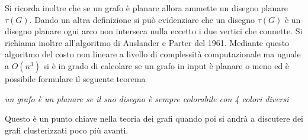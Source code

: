Si ricorda inoltre che se un grafo è planare allora ammette un disegno planare $\tau(G)$. Dando un altra definizione si può evidenziare che un disegno $\tau(G)$ è un disegno planare ogni arco non interseca nulla eccetto i due vertici che connette. Si richiama inoltre all'algoritmo di Auslander e Parter del 1961. Mediante questo algoritmo del costo non lineare a livello di complessità computazionale ma uguale a $O(n^3)$ si è in grado di calcolare se un grafo in input è planare o meno ed è possibile formulare il seguente teorema
\begin{center}
	\textit{un grafo è un planare se il suo disegno è sempre colorabile con 4 colori diversi}
\end{center}
 Questo è un punto chiave nella teoria dei grafi quando poi si andrà a discutere dei grafi clusterizzati poco più avanti.

